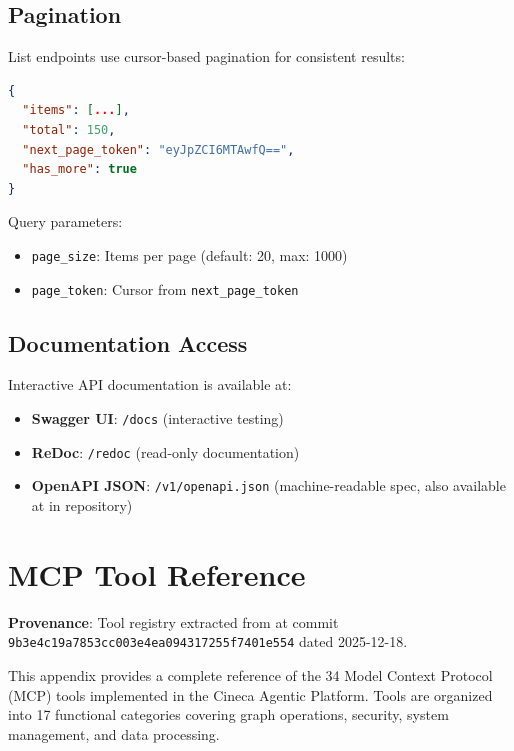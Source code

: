 \documentclass[a4paper,twoside]{sapthesis}
\begin{document}
\section{Pagination}
\label{app:api:pagination}

List endpoints use cursor-based pagination for consistent results:

\begin{lstlisting}[language=json]
{
  "items": [...],
  "total": 150,
  "next_page_token": "eyJpZCI6MTAwfQ==",
  "has_more": true
}
\end{lstlisting}

Query parameters:
\begin{itemize}
    \item \texttt{page\_size}: Items per page (default: 20, max: 1000)
    \item \texttt{page\_token}: Cursor from \texttt{next\_page\_token}
\end{itemize}

\section{Documentation Access}
\label{app:api:docs}

Interactive API documentation is available at:

\begin{itemize}
    \item \textbf{Swagger UI}: \texttt{/docs} (interactive testing)
    \item \textbf{ReDoc}: \texttt{/redoc} (read-only documentation)
    \item \textbf{OpenAPI JSON}: \texttt{/v1/openapi.json} (machine-readable spec, also available at  in repository)
\end{itemize}


\chapter{MCP Tool Reference}
\label{app:tool-reference}

\textbf{Provenance}: Tool registry extracted from  at commit \texttt{9b3e4c19a7853cc003e4ea094317255f7401e554} dated 2025-12-18.

This appendix provides a complete reference of the 34 Model Context Protocol (MCP) tools implemented in the Cineca Agentic Platform. Tools are organized into 17 functional categories covering graph operations, security, system management, and data processing.
\end{document}
